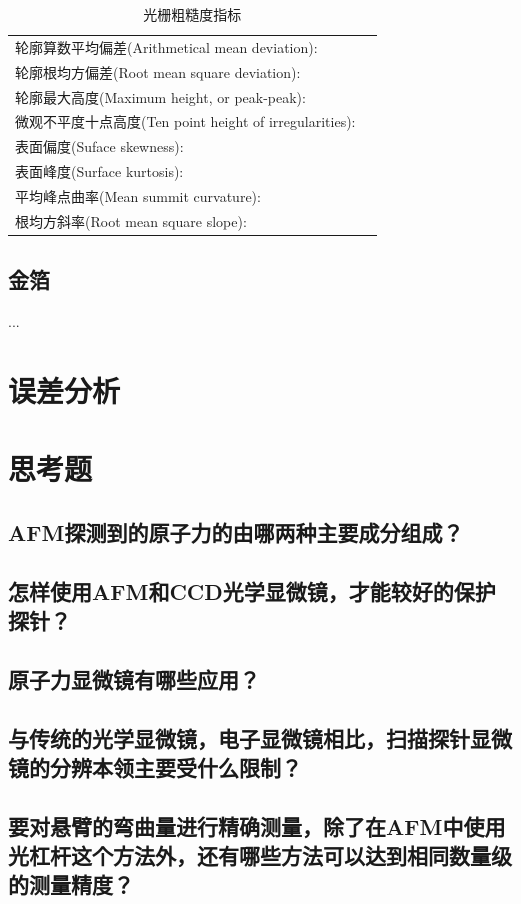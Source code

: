 \documentclass[a4paper]{article}
\begin{document}
\begin{table}[H]
	\begin{tabular}{lc}
		\hline
		轮廓算数平均偏差(Arithmetical mean deviation): & $  $\\
		
		轮廓根均方偏差(Root mean square deviation): & $  $\\
		
		轮廓最大高度(Maximum height, or peak-peak): & $  $\\
		
		微观不平度十点高度(Ten point height of irregularities): & $  $\\
		
		表面偏度(Suface skewness): & $  $\\
		
		表面峰度(Surface kurtosis): & $  $\\
		
		平均峰点曲率(Mean summit curvature): & $  $\\
		
		根均方斜率(Root mean square slope):  & $  $\\
		\hline
	\end{tabular}
	\caption{光栅粗糙度指标}
\end{table}

\subsection{金箔}

...


\section{误差分析}

\section{思考题}
\subsection*{AFM探测到的原子力的由哪两种主要成分组成？}
\subsection*{怎样使用AFM和CCD光学显微镜，才能较好的保护探针？}
\subsection*{原子力显微镜有哪些应用？}
\subsection*{与传统的光学显微镜，电子显微镜相比，扫描探针显微镜的分辨本领主要受什么限制？}
\subsection*{要对悬臂的弯曲量进行精确测量，除了在AFM中使用光杠杆这个方法外，还有哪些方法可以达到相同数量级的测量精度？}

\nocite{jiaocai}

\end{document}
